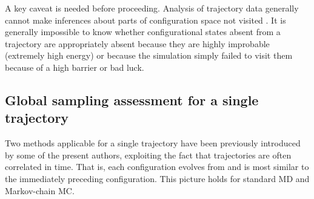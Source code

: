 A key caveat is needed before proceeding.
Analysis of trajectory data generally cannot make inferences about parts of configuration space not visited \cite{Grossfield2009}.
It is generally impossible to know whether configurational states absent from a trajectory are appropriately absent because they are highly improbable (extremely high energy) or because the simulation simply failed to visit them because of a high barrier or bad luck.

\subsection{Global sampling assessment for a single trajectory}
Two methods applicable for a single trajectory have been previously introduced by some of the present authors, exploiting the fact that trajectories are often correlated in time.
That is, each configuration evolves from and is most similar to the immediately preceding configuration.
This picture holds for standard MD and Markov-chain MC.

